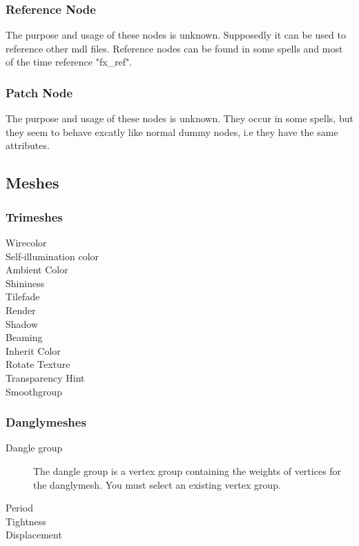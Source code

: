 \subsubsection{Reference Node}
The purpose and usage of these nodes is unknown. Supposedly it can be used to
reference other mdl files. Reference nodes can be found in some spells and
most of the time reference "fx_ref".

\subsubsection{Patch Node}
The purpose and usage of these nodes is unknown. They occur in some spells, but
they seem to behave excatly like normal dummy nodes, i.e they have the same
attributes.

\subsection{Meshes}

\subsubsection{Trimeshes}

\begin{description}
    \item[Wirecolor]
    \item[Self-illumination color]
    \item[Ambient Color]
    \item[Shininess]
    \item[Tilefade]
    \item[Render]
    \item[Shadow]
    \item[Beaming]
    \item[Inherit Color]
    \item[Rotate Texture]
    \item[Transparency Hint]
    \item[Smoothgroup]
\end{description}

\subsubsection{Danglymeshes}
\begin{description}
    \item[Dangle group] The dangle group is a vertex group containing the weights of vertices for the danglymesh. You must select an existing vertex group.
    \item[Period]
    \item[Tightness]
    \item[Displacement]
\end{description}

